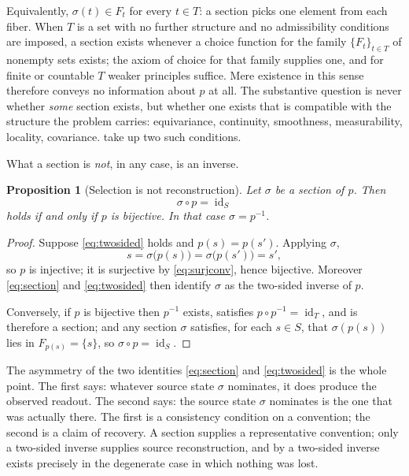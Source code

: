 \documentclass[11pt,reqno]{amsart}
\theoremstyle{plain}
\newtheorem{proposition}[theorem]{Proposition}
\theoremstyle{definition}
\theoremstyle{remark}
\DeclareMathOperator{\id}{id}
\begin{document}
Equivalently, $\sigma(t)\in F_{t}$ for every $t\in T$: a section picks one element from each fiber. When $T$ is a set with no further structure and no admissibility conditions are imposed, a section exists whenever a choice function for the family $\{F_{t}\}_{t\in T}$ of nonempty sets exists; the axiom of choice for that family supplies one, and for finite or countable $T$ weaker principles suffice. Mere existence in this sense therefore conveys no information about $p$ at all. The substantive question is never whether \emph{some} section exists, but whether one exists that is compatible with the structure the problem carries: equivariance, continuity, smoothness, measurability, locality, covariance.  take up two such conditions.

What a section is \emph{not}, in any case, is an inverse.

\begin{proposition}[Selection is not reconstruction]
\label{prop:selection}
Let $\sigma$ be a section of $p$. Then
\begin{equation}
\label{eq:twosided}
\sigma\circ p=\id_{S}
\end{equation}
holds if and only if $p$ is bijective. In that case $\sigma=p^{-1}$.
\end{proposition}

\begin{proof}
Suppose \eqref{eq:twosided} holds and $p(s)=p(s')$. Applying $\sigma$,
\[
s=\sigma\bigl(p(s)\bigr)=\sigma\bigl(p(s')\bigr)=s',
\]
so $p$ is injective; it is surjective by \eqref{eq:surjconv}, hence bijective. Moreover \eqref{eq:section} and \eqref{eq:twosided} then identify $\sigma$ as the two-sided inverse of $p$.

Conversely, if $p$ is bijective then $p^{-1}$ exists, satisfies $p\circ p^{-1}=\id_{T}$, and is therefore a section; and any section $\sigma$ satisfies, for each $s\in S$, that $\sigma(p(s))$ lies in $F_{p(s)}=\{s\}$, so $\sigma\circ p=\id_{S}$.
\end{proof}

The asymmetry of the two identities \eqref{eq:section} and \eqref{eq:twosided} is the whole point. The first says: whatever source state $\sigma$ nominates, it does produce the observed readout. The second says: the source state $\sigma$ nominates is the one that was actually there. The first is a consistency condition on a convention; the second is a claim of recovery. A section supplies a representative convention; only a two-sided inverse supplies source reconstruction, and by  a two-sided inverse exists precisely in the degenerate case in which nothing was lost.
\end{document}
